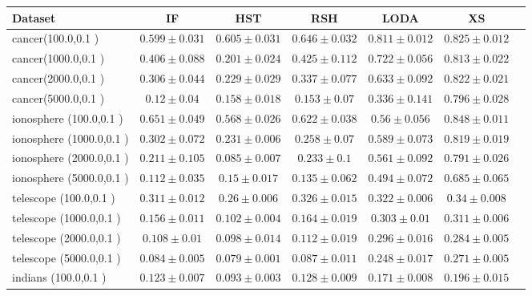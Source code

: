 \documentclass[11pt,onecolumn]{article}
\begin{document}
\begin{footnotesize}
\begin{table}[p!]
		\begin{tabular}{lcccccc}
				\toprule
				\textbf{Dataset} & \textbf{IF} &  \textbf{HST} & \textbf{RSH} &  \textbf{LODA}  & \textbf{XS}\\
\toprule
cancer(100.0,0.1 )& $0.599 \pm 0.031$ &  $0.605 \pm 0.031$ &  $0.646 \pm 0.032$ &  $0.811 \pm 0.012$ &  $0.825 \pm 0.012$    \\
cancer(1000.0,0.1 )& $0.406 \pm 0.088$ &  $0.201 \pm 0.024$ &  $0.425 \pm 0.112$ &  $0.722 \pm 0.056$ &  $0.813 \pm 0.022$    \\
cancer(2000.0,0.1 )& $0.306 \pm 0.044$ &  $0.229 \pm 0.029$ &  $0.337 \pm 0.077$ &  $0.633 \pm 0.092$ &  $0.822 \pm 0.021$    \\
cancer(5000.0,0.1 )& $0.12 \pm 0.04$ &  $0.158 \pm 0.018$ &  $0.153 \pm 0.07$ &  $0.336 \pm 0.141$ &  $0.796 \pm 0.028$    \\
\midrule
ionosphere (100.0,0.1 )& $0.651 \pm 0.049$ &  $0.568 \pm 0.026$ &  $0.622 \pm 0.038$ &  $0.56 \pm 0.056$ &  $0.848 \pm 0.011$    \\
ionosphere (1000.0,0.1 )& $0.302 \pm 0.072$ &  $0.231 \pm 0.006$ &  $0.258 \pm 0.07$ &  $0.589 \pm 0.073$ &  $0.819 \pm 0.019$    \\
ionosphere (2000.0,0.1 )& $0.211 \pm 0.105$ &  $0.085 \pm 0.007$ &  $0.233 \pm 0.1$ &  $0.561 \pm 0.092$ &  $0.791 \pm 0.026$    \\
ionosphere (5000.0,0.1 )& $0.112 \pm 0.035$ &  $0.15 \pm 0.017$ &  $0.135 \pm 0.062$ &  $0.494 \pm 0.072$ &  $0.685 \pm 0.065$    \\
\midrule
telescope (100.0,0.1 )& $0.311 \pm 0.012$ &  $0.26 \pm 0.006$ &  $0.326 \pm 0.015$ &  $0.322 \pm 0.006$ &  $0.34 \pm 0.008$    \\
telescope (1000.0,0.1 )& $0.156 \pm 0.011$ &  $0.102 \pm 0.004$ &  $0.164 \pm 0.019$ &  $0.303 \pm 0.01$ &  $0.311 \pm 0.006$    \\
telescope (2000.0,0.1 )& $0.108 \pm 0.01$ &  $0.098 \pm 0.014$ &  $0.112 \pm 0.019$ &  $0.296 \pm 0.016$ &  $0.284 \pm 0.005$    \\
telescope (5000.0,0.1 )& $0.084 \pm 0.005$ &  $0.079 \pm 0.001$ &  $0.087 \pm 0.011$ &  $0.248 \pm 0.017$ &  $0.271 \pm 0.005$    \\
\midrule
indians (100.0,0.1 )& $0.123 \pm 0.007$ &  $0.093 \pm 0.003$ &  $0.128 \pm 0.009$ &  $0.171 \pm 0.008$ &  $0.196 \pm 0.015$    \\

\end{tabular}
\end{table}
\end{footnotesize}
\end{document}
